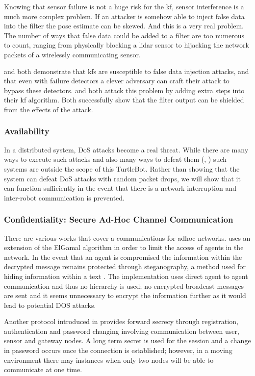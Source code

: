 \documentclass[conference]{IEEEtran}
\begin{document}
Knowing that sensor failure is not a huge risk for the \gls{kf}, sensor interference is a much more complex problem. If an attacker is somehow able to inject false data into the filter the pose estimate can be skewed. And this is a very real problem. The number of ways that false data could be added to a filter are too numerous to count, ranging from physically blocking a lidar sensor to hijacking the network packets of a wirelessly communicating sensor.

\cite{Mo2010} and \cite{Yang2013} both demonstrate that \glspl{kf} are susceptible to false data injection attacks, and that even with failure detectors a clever adversary can craft their attack to bypass these detectors. \cite{Bezzo_2014} and \cite{Mo2014} both attack this problem by adding extra steps into their \gls{kf} algorithm. Both successfully show that the filter output can be shielded from the effects of the attack.

\subsubsection{Availability}
In a distributed system, \gls{DoS} attacks become a real threat. While there are many ways to execute such attacks and also many ways to defeat them (\cite{wood2002denial}, \cite{bellardo2003802}) such systems are outside the scope of this TurtleBot. Rather than showing that the system can defeat \gls{DoS} attacks with random packet drops, we will show that it can function sufficiently in the event that there is a network interruption and inter-robot communication is prevented.

\subsubsection{Confidentiality: Secure Ad-Hoc Channel Communication}
There are various works that cover a communications for adhoc networks. \cite{vegh2014securing} uses an extension of the ElGamal algorithm in order to limit the access of agents in the network. In the event that an agent is compromised the information within the decrypted message remains protected through steganography, a method used for hiding information within a text \cite{adi2009mechatronic}. The implementation uses direct agent to agent communication and thus no hierarchy is used; no encrypted broadcast messages are sent and it seems unnecessary to encrypt the information further as it would lead to potential DOS attacks.

Another protocol introduced in \cite{chang2016provably} provides forward secrecy through registration, authentication and password changing involving communication between user, sensor and gateway nodes. A long term secret is used for the session and a change in password occurs once the connection is established; however, in a moving environment there may instances when only two nodes will be able to communicate at one time.
\end{document}
